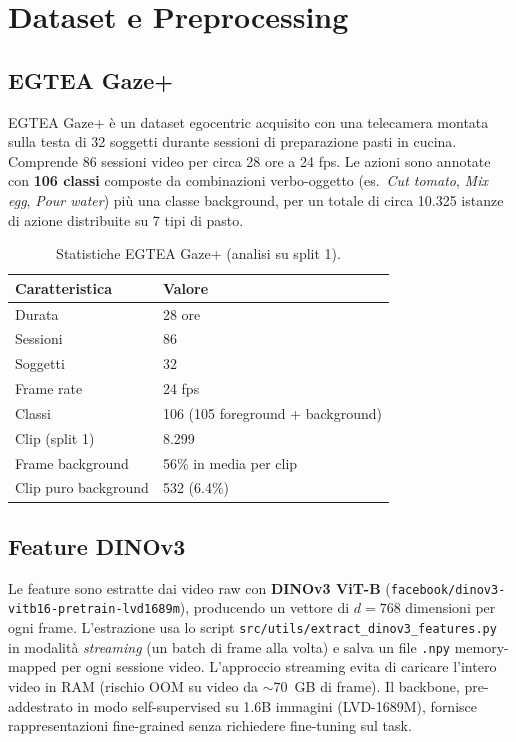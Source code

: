 \documentclass[12pt, a4paper]{article}
\begin{document}
\section{Dataset e Preprocessing}
\label{sec:dataset}

\subsection{EGTEA Gaze+}

EGTEA Gaze+ \cite{li2018eye} \`e un dataset egocentric acquisito con una
telecamera montata sulla testa di 32 soggetti durante sessioni di preparazione
pasti in cucina. Comprende 86 sessioni video per circa 28 ore a 24 fps.
Le azioni sono annotate con \textbf{106 classi} composte da combinazioni
verbo-oggetto (es.\ \textit{Cut tomato}, \textit{Mix egg}, \textit{Pour water})
pi\`u una classe background, per un totale di circa 10.325 istanze di azione
distribuite su 7 tipi di pasto.

\begin{table}[H]
\centering
\caption{Statistiche EGTEA Gaze+ (analisi su split 1).}
\begin{tabular}{ll}
\toprule
\textbf{Caratteristica} & \textbf{Valore} \\
\midrule
Durata           & 28 ore \\
Sessioni         & 86 \\
Soggetti         & 32 \\
Frame rate       & 24 fps \\
Classi           & 106 (105 foreground + background) \\
Clip (split 1)   & 8.299 \\
Frame background & 56\% in media per clip \\
Clip puro background & 532 (6.4\%) \\
\bottomrule
\end{tabular}
\end{table}

\subsection{Feature DINOv3}
\label{sec:features}

Le feature sono estratte dai video raw con \textbf{DINOv3 ViT-B}
\cite{dinov3} (\texttt{facebook/dinov3-vitb16-pretrain-lvd1689m}),
producendo un vettore di \textbf{$d = 768$} dimensioni per ogni frame.
L'estrazione usa lo script \texttt{src/utils/extract\_dinov3\_features.py}
in modalit\`a \textit{streaming} (un batch di frame alla volta) e salva un
file \texttt{.npy} memory-mapped per ogni sessione video.
L'approccio streaming evita di caricare l'intero video in RAM (rischio OOM su
video da $\sim$70~GB di frame). Il backbone, pre-addestrato in modo
self-supervised su 1.6B immagini (LVD-1689M), fornisce rappresentazioni
fine-grained senza richiedere fine-tuning sul task.
\end{document}
